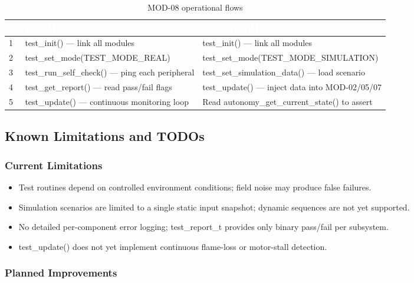 \documentclass[12pt,a4paper]{article}
\newcommand{\theadtext}[1]{\textcolor{white}{\textbf{#1}}}
\newcommand{\fn}[1]{{\footnotesize\ttfamily #1}}
\begin{document}
\begin{table}[H]
\centering\small
\begin{tabularx}{\textwidth}{C{0.7cm} L{7cm} X}
\toprule
{}
\theadtext{\#} & \theadtext{Real Mode} & \theadtext{Simulation Mode} \\
\midrule
{}   1 & \fn{test\_init()} --- link all modules & \fn{test\_init()} --- link all modules \\
 2 & \fn{test\_set\_mode(TEST\_MODE\_REAL)} & \fn{test\_set\_mode(TEST\_MODE\_SIMULATION)} \\
   3 & \fn{test\_run\_self\_check()} --- ping each peripheral & \fn{test\_set\_simulation\_data()} --- load scenario \\
 4 & \fn{test\_get\_report()} --- read pass/fail flags & \fn{test\_update()} --- inject data into MOD-02/05/07 \\
   5 & \fn{test\_update()} --- continuous monitoring loop & Read \fn{autonomy\_get\_current\_state()} to assert \\
\bottomrule
\end{tabularx}
\caption{MOD-08 operational flows}
\end{table}

\subsection{Known Limitations and TODOs}

\subsubsection{Current Limitations}

\begin{itemize}[leftmargin=1.5em]
  \item Test routines depend on controlled environment conditions; field noise may produce false failures.
  \item Simulation scenarios are limited to a single static input snapshot; dynamic sequences are not yet supported.
  \item No detailed per-component error logging; \fn{test\_report\_t} provides only binary pass/fail per subsystem.
  \item \fn{test\_update()} does not yet implement continuous flame-loss or motor-stall detection.
\end{itemize}

\subsubsection{Planned Improvements}
\end{document}
